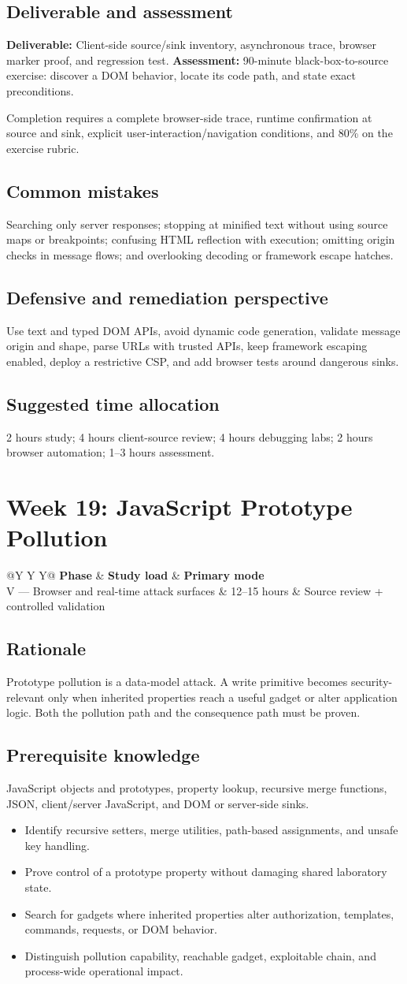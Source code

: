 \documentclass[11pt]{article}
\makeatletter
\newcommand{\weekheader}[4]{%
  \clearpage
  \section{Week #1: #2}
  \begin{tcolorbox}[colback=Navy,colframe=Navy,coltext=white]
    \begin{tabularx}{\linewidth}{@{}Y Y Y@{}}
      \textbf{Phase} & \textbf{Study load} & \textbf{Primary mode}\\
      #3 & #4 hours & Source review + controlled validation
    \end{tabularx}
  \end{tcolorbox}
}
\newcommand{\weekfield}[2]{%
  \Needspace{5\baselineskip}
  \subsection*{#1}
  #2
}
\newcommand{\deliverable}[1]{\textbf{Deliverable:} #1}
\newcommand{\assessment}[1]{\textbf{Assessment:} #1}
\makeatother
\begin{document}
\weekfield{Deliverable and assessment}{\deliverable{Client-side source/sink
inventory, asynchronous trace, browser marker proof, and regression test.}
\assessment{90-minute black-box-to-source exercise: discover a DOM behavior,
locate its code path, and state exact preconditions.}}

\begin{checkpoints}
Completion requires a complete browser-side trace, runtime confirmation at source
and sink, explicit user-interaction/navigation conditions, and 80\% on the
exercise rubric.
\end{checkpoints}

\weekfield{Common mistakes}{Searching only server responses; stopping at minified
text without using source maps or breakpoints; confusing HTML reflection with
execution; omitting origin checks in message flows; and overlooking decoding or
framework escape hatches.}

\weekfield{Defensive and remediation perspective}{Use text and typed DOM APIs,
avoid dynamic code generation, validate message origin and shape, parse URLs with
trusted APIs, keep framework escaping enabled, deploy a restrictive CSP, and add
browser tests around dangerous sinks.}

\weekfield{Suggested time allocation}{2 hours study; 4 hours client-source review;
4 hours debugging labs; 2 hours browser automation; 1--3 hours assessment.}

\weekheader{19}{JavaScript Prototype Pollution}{V --- Browser and real-time attack surfaces}{12--15}

\weekfield{Rationale}{Prototype pollution is a data-model attack. A write primitive
becomes security-relevant only when inherited properties reach a useful gadget or
alter application logic. Both the pollution path and the consequence path must be
proven.}

\weekfield{Prerequisite knowledge}{JavaScript objects and prototypes, property
lookup, recursive merge functions, JSON, client/server JavaScript, and DOM or
server-side sinks.}

\begin{objectivebox}
\begin{itemize}
  \item Identify recursive setters, merge utilities, path-based assignments, and unsafe key handling.
  \item Prove control of a prototype property without damaging shared laboratory state.
  \item Search for gadgets where inherited properties alter authorization, templates, commands, requests, or DOM behavior.
  \item Distinguish pollution capability, reachable gadget, exploitable chain, and process-wide operational impact.
\end{itemize}
\end{objectivebox}
\end{document}
